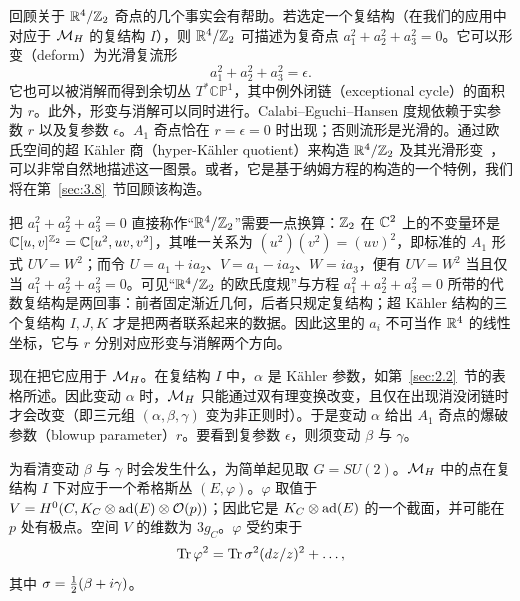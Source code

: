 回顾关于 ${\mathbb{R}}^4/{\mathbb{Z}}_2$ 奇点的几个事实会有帮助。若选定一个复结构（在我们的应用中对应于 ${{\mathcal{M}}_H}$ 的复结构 $I$），则 ${\mathbb{R}}^4/{\mathbb{Z}}_2$ 可描述为复奇点 $a_1^2+a_2^2+a_3^2=0$。它可以形变（deform）为光滑复流形
\setcounter{equation}{79}
\begin{equation}\label{eq:3.80}
  a_1^2+a_2^2+a_3^2=\epsilon.
\end{equation}
它也可以被消解而得到余切丛 $T^*\mathbb{CP}^1$，其中例外闭链（exceptional cycle）的面积为 $r$。此外，形变与消解可以同时进行。Calabi–Eguchi–Hansen 度规依赖于实参数 $r$ 以及复参数 $\epsilon$。$A_1$ 奇点恰在 $r=\epsilon=0$ 时出现；否则流形是光滑的。通过欧氏空间的超 Kähler 商（hyper-Kähler quotient）来构造 ${\mathbb{R}}^4/{\mathbb{Z}}_2$ 及其光滑形变~\cite{ref62}，可以非常自然地描述这一图景。或者，它是基于纳姆方程的构造的一个特例，我们将在第~\ref{sec:3.8}~节回顾该构造。

\begin{yizhu}[易错点]
把 $a_1^2+a_2^2+a_3^2=0$ 直接称作“${\mathbb{R}}^4/{\mathbb{Z}}_2$”需要一点换算：${\mathbb{Z}}_2$ 在 ${\mathbb{C}}^2$ 上的不变量环是 ${\mathbb{C}}[u,v]^{{\mathbb{Z}}_2}={\mathbb{C}}[u^2,uv,v^2]$，其唯一关系为 $(u^2)(v^2)=(uv)^2$，即标准的 $A_1$ 形式 $UV=W^2$；而令 $U=a_1+ia_2$、$V=a_1-ia_2$、$W=ia_3$，便有 $UV=W^2$ 当且仅当 $a_1^2+a_2^2+a_3^2=0$。可见“${\mathbb{R}}^4/{\mathbb{Z}}_2$ 的欧氏度规”与方程 $a_1^2+a_2^2+a_3^2=0$ 所带的代数复结构是两回事：前者固定渐近几何，后者只规定复结构；超 Kähler 结构的三个复结构 $I,J,K$ 才是把两者联系起来的数据。因此这里的 $a_i$ 不可当作 ${\mathbb{R}}^4$ 的线性坐标，它与 $r$ 分别对应形变与消解两个方向。
\end{yizhu}

现在把它应用于 ${{\mathcal{M}}_H}$。在复结构 $I$ 中，$\alpha$ 是 Kähler 参数，如第~\ref{sec:2.2}~节的表格所述。因此变动 $\alpha$ 时，${{\mathcal{M}}_H}$ 只能通过双有理变换改变，且仅在出现消没闭链时才会改变（即三元组 $(\alpha,\beta,\gamma)$ 变为非正则时）。于是变动 $\alpha$ 给出 $A_1$ 奇点的爆破参数（blowup parameter）$r$。要看到复参数 $\epsilon$，则须变动 $\beta$ 与 $\gamma$。

\bigskip{}

为看清变动 $\beta$ 与 $\gamma$ 时会发生什么，为简单起见取 $G=SU(2)$。${{\mathcal{M}}_H}$ 中的点在复结构 $I$ 下对应于一个希格斯丛 $(E,\varphi)$。$\varphi$ 取值于 $V=H^0(C,K_C\otimes {\rm ad}(E)\otimes {\mathcal O}(p))$；因此它是 $K_C\otimes {\rm ad}(E)$ 的一个截面，并可能在 $p$ 处有极点。空间 $V$ 的维数为 $3g_C$。$\varphi$ 受约束于
\setcounter{equation}{80}
\begin{equation}\label{eq:3.81}
  {\rm Tr}\,\varphi^2={\rm Tr}\,\sigma^2 (dz/z)^2+\dots,
\end{equation}
其中 $\sigma=\frac{1}{2}(\beta+i\gamma)$。

